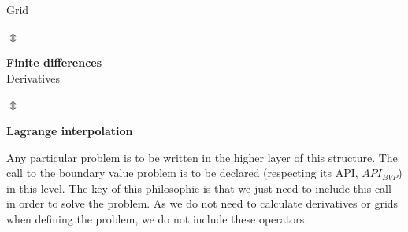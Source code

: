 \begin{framed}
\begin{framed}
\begin{multicols}{2}
\begin{framed}
\hspace{0.5cm} Grid \hfill {}\\

\end{framed}

\begin{centering}

\begin{large}
$\Updownarrow$
\end{large}

\end{centering}

\columnbreak

\begin{framed}
{\large{\textbf{Finite differences}}}\\

\hspace{0.5cm} Derivatives \hfill {}\\

\end{framed}

\begin{centering}

\begin{large}
$\Updownarrow$
\end{large}

\end{centering}

\end{multicols}


\begin{framed}

\begin{centering}

{{\textbf{Lagrange interpolation}}}

\end{centering}

\end{framed}



\end{framed}

\end{framed}


Any particular problem is to be written in the higher layer of this structure.
The call to the boundary value problem is to be declared
(respecting its API, $API_{BVP}$) in this level. The key of this philosophie is
that we just need to include this call in order to solve the problem. As we do
not need to calculate derivatives or grids when defining the problem, we
do not include these operators.\\

